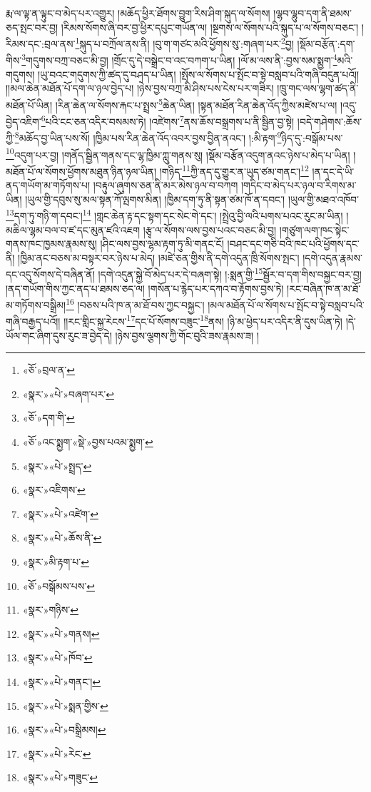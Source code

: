 རྨ་ལ་ལྟ་ན་ལྟུང་བ་མེད་པར་འགྱུར། །མཆོད་ཕྱིར་ཐོགས་བྱུག་རིས་ཤིག་སྐུད་ལ་སོགས། །ལྷབ་ལྷུབ་དག་ནི་ཐམས་ཅད་སྤང་བར་བྱ། །རིམས་སོགས་ཞི་བར་བྱ་ཕྱིར་དཔུང་གཡོན་ལ། །སྔགས་ལ་སོགས་པའི་སྐུད་པ་ལ་སོགས་བཅང་། །རིམས་དང་:བྲལ་ནས་\footnote{«ཅོ་»བྲལ་ན་}སྐུད་པ་བཀྲོལ་ནས་ནི། །བུ་ག་གཙང་མའི་ཕྱོགས་སུ་:གཞག་པར་\footnote{«སྣར་»«པེ་»བཞག་པར་}བྱ། །སྡོམ་བརྩོན་:དག་གིས་\footnote{«ཅོ་»དག་གི་}གདུགས་བཀྲ་བཅང་མི་བྱ། །གྲོང་དུ་དེ་བསྒྲེང་བ་འང་བཀག་པ་ཡིན། །ལོ་མ་ལས་ནི་:བྱས་སམ་སྨྱག་\footnote{«ཅོ་»འང་སྨྱག་«སྡེ་»བྱས་པའམ་སྨྱག་}མའི་གདུགས། །ཡུ་བའང་གདུགས་ཀྱི་ཚད་དུ་བཤད་པ་ཡིན། །སྤོས་ལ་སོགས་པ་སྤོང་བ་སྟེ་བསླབ་པའི་གཞི་བདུན་པའོ།། །།མལ་ཆེན་མཐོན་པོ་དག་ལ་ཉལ་བྱེད་པ། །ཉེས་བྱས་བཀྲ་མི་ཤིས་པས་ངེས་པར་གཟིར། །ཁྲུ་གང་ལས་ལྷག་ཚད་ནི་མཐོན་པོ་ཡིན། །རིན་ཆེན་ལ་སོགས་རྐང་པ་སྤྲས་\footnote{«སྣར་»«པེ་»སྤྲད་}ཆེན་ཡིན། །སྟན་མཐོན་རིན་ཆེན་འོད་ཀྱིས་མཛེས་པ་ལ། །འདུ་བྱེད་འཇིག་\footnote{«སྣར་»འཇིགས་}པའི་ངང་ཅན་འདིར་བསམས་ཏེ། །འཛེགས་\footnote{«སྣར་»«པེ་»འཛེག་}ནས་ཆོས་བསྒྲགས་པ་ནི་སྦྱིན་བྱ་སྟེ། །བདེ་གཤེགས་:ཆོས་ཀྱི་\footnote{«སྣར་»«པེ་»ཆོས་ནི་}མཆོད་བྱ་ཡིན་པས་སོ། །ཁྱིམ་པས་རིན་ཆེན་འོད་འབར་བྱས་བྱིན་ནའང་། །:མི་རྟག་\footnote{«སྣར་»མི་རྟག་པ་}ཉིད་དུ་:བསྒོམ་པས་\footnote{«ཅོ་»བསྒོམས་པས་}འདུག་པར་བྱ། །གནོད་སྦྱིན་གནས་དང་ལྷ་ཁྱིམ་ཀླུ་གནས་སུ། །སྡོམ་བརྩོན་འདུག་ནའང་ཉེས་པ་མེད་པ་ཡིན། །མཐོན་པོ་ལ་སོགས་ཕྱོགས་མཐུན་ཉིན་ཉལ་ཡིན། །གཉིད་\footnote{«སྣར་»གཉིས་}ཀྱི་ནད་དུ་གྱུར་ན་ཡུད་ཙམ་གནང་།\footnote{«སྣར་»«པེ་»གནས།} །ན་དང་དེ་ཡི་ནད་གཡོག་མ་གཏོགས་པ། །བརྟུལ་ཞུགས་ཅན་ནི་མར་མེས་ཉལ་བ་བཀག །གདིང་བ་མེད་པར་ཉལ་བ་རིགས་མ་ཡིན། །ཡུལ་གྱི་དབུས་སུ་མལ་སྟན་ཀོ་ལྤགས་མིན། །ཁྱིམ་དག་ཏུ་ནི་སྟན་ཙམ་ཁོ་ན་དབང་། །ཡུལ་གྱི་མཐའ་འཁོབ་\footnote{«སྣར་»«པེ་»ཁོབ་}དག་ཏུ་གཉི་ག་དབང་།\footnote{«སྣར་»«པེ་»གནང་།} །གླང་ཆེན་རྟ་དང་སྟག་དང་སེང་གེ་དང་། །སྤྲེའུ་བྱི་ལའི་པགས་པའང་རུང་མ་ཡིན། །མཆིལ་ལྷམ་བལ་བ་ཛ་དང་མུན་ཛའི་འཇག །རྩྭ་ལ་སོགས་ལས་བྱས་པའང་བཅང་མི་བྱ། །གཙུག་ལག་ཁང་སྟེང་གནས་ཁང་ཁྱམས་རྣམས་སུ། །ཤིང་ལས་བྱས་ལྷམ་རྟག་ཏུ་མི་གནང་ངོ། །བཤང་དང་གཅི་བའི་ཁང་པའི་ཕྱོགས་དང་ནི། །ཁྱིམ་ནང་བཅས་མ་བསྟར་བར་ཉེས་པ་མེད། །མཛེ་ཅན་གྱིས་ནི་དགེ་འདུན་ཁྲི་སོགས་སྤང་། །དགེ་འདུན་རྣམས་དང་འདུ་སོགས་དེ་བཞིན་ནོ། །དགེ་འདུན་སྐྱེ་བོ་མེད་པར་དེ་བཞག་སྟེ། །:སྨན་གྱི་\footnote{«སྣར་»«པེ་»སྨན་གྱིས་}སྦྱོར་བ་དག་གིས་བསྐྱང་བར་བྱ། །ནད་གཡོག་གིས་ཀྱང་ནད་པ་ཐམས་ཅད་ལ། །གསོན་པ་རྙེད་པར་དཀའ་བ་རྟོགས་བྱས་ཏེ། །རང་བཞིན་ཁ་ན་མ་ཐོ་མ་གཏོགས་བསྒྲིམ།\footnote{«སྣར་»«པེ་»བསྒྲིམས།} །བཅས་པའི་ཁ་ན་མ་ཐོ་བས་ཀྱང་བསྐྱང་། །མལ་མཐོན་པོ་ལ་སོགས་པ་སྤོང་བ་སྟེ་བསླབ་པའི་གཞི་བརྒྱད་པའོ།། །།རང་གླིང་སྐྱ་རེངས་\footnote{«སྣར་»«པེ་»རེང་}དང་པོ་སོགས་བཟུང་\footnote{«སྣར་»«པེ་»གཟུང་}ནས། །ཉི་མ་ཕྱེད་པར་འདིར་ནི་དུས་ཡིན་ཏེ། །དེ་ཡོལ་གང་ཞིག་དུས་རུང་ཟ་བྱེད་དེ། །ཉེས་བྱས་ལྕགས་ཀྱི་གོང་བུའི་ཟས་རྣམས་ཟ། །

